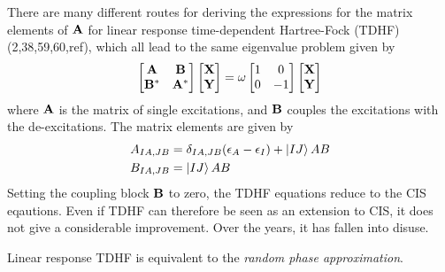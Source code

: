 There are many different routes for deriving the expressions for the matrix elements of $\mathbf{A}$ for linear response time-dependent Hartree-Fock (TDHF) (2,38,59,60,ref), which all lead to the same eigenvalue problem given by 
\begin{equation}
\begin{bmatrix}
\mathbf{A} & \mathbf{B} \\
\mathbf{B}^* & \mathbf{A}^* 
\end{bmatrix} 
\begin{bmatrix}
\mathbf{X} \\
\mathbf{Y} 
\end{bmatrix}
= 
\omega 
\begin{bmatrix}
1 & 0 \\
0 & -1
\end{bmatrix}
\begin{bmatrix}
\mathbf{X} \\
\mathbf{Y} 
\end{bmatrix}
\label{eq:TDSCF}
\end{equation}
\noindent where $\mathbf{A}$ is the matrix of single excitations, and $\mathbf{B}$ couples the excitations with the de-excitations. The matrix elements are given by
\begin{align}
A_{IA,JB} &= \delta_{IA,JB} (\epsilon_A - \epsilon_I) + \ket{\smash{IJ}}{AB} \\
B_{IA,JB} &= \ket{\smash{IJ}}{AB}
\end{align}
\noindent Setting the coupling block $\mathbf{B}$ to zero, the TDHF equations reduce to the CIS eqautions. Even if TDHF can therefore be seen as an extension to CIS, it does not give a considerable improvement. Over the years, it has fallen into disuse.

Linear response TDHF is equivalent to the \emph{random phase approximation}. 



